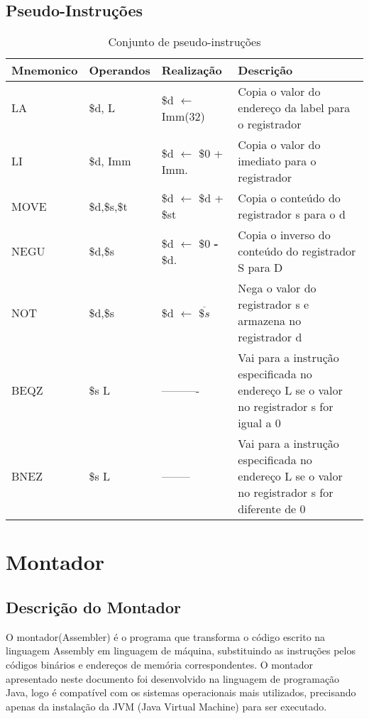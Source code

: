 \documentclass{report}
\begin{document}
   \subsection{Pseudo-Instruções}
   \FloatBarrier
    \begin{table}[H]
      \begin{center}
        \begin{tabular}[pos]{|m{3cm}|m{2.8cm}|m{3cm}|m{4cm}|} 
          \hline
          \cellcolor[gray]{0.9}\textbf{Mnemonico} & \cellcolor[gray]{0.9}\textbf{Operandos} & \cellcolor[gray]{0.9}\textbf{Realização} & \cellcolor[gray]{0.9}\textbf{Descrição} \\ \hline
              LA  & \$d, L & \$d $\leftarrow$ Imm(32)  &  Copia o valor do endereço da label para o registrador\\ \hline 
              LI  &  \$d, Imm & \$d $\leftarrow$ \$0 + Imm. &  Copia o valor do imediato para o registrador\\
\hline
              MOVE  &  \$d,\$s,\$t &  \$d $\leftarrow$ \$d + \$st &  Copia o conteúdo do registrador s para o d\\ \hline 
              NEGU  & \$d,\$s & \$d $\leftarrow$ \$0 \textbf{-} \$d. &  Copia o inverso do conteúdo do registrador S para D\\ \hline 
              NOT  &  \$d,\$s & \$d $\leftarrow$ $\overline{\$s}$ &  Nega o valor do registrador s e armazena no registrador d\\ \hline 
              BEQZ  &  \$s L & ----------&  Vai para a instrução especificada no endereço L se o valor no registrador s for igual a 0\\ \hline 
              BNEZ  & \$s L & -------- &  Vai para a instrução especificada no endereço L se o valor no registrador s for diferente de 0\\ \hline 
                        
        \end{tabular}
        \caption{Conjunto de pseudo-instruções}
		\label{table:conjOpPse}
      \end{center}
    \end{table}
    
  
   \section{Montador}
    	\subsection{Descrição do Montador}
    O montador(Assembler) é o programa que transforma o código escrito na linguagem Assembly em linguagem de máquina, substituindo as instruções pelos códigos binários e endereços de memória correspondentes. 
    O montador apresentado neste documento foi desenvolvido na linguagem de programação Java, logo é compatível com os sistemas operacionais mais utilizados, precisando apenas da instalação da JVM (Java Virtual Machine) para ser executado.
   
\end{document}
